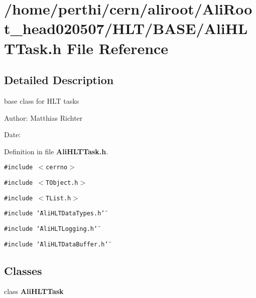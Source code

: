 \section{/home/perthi/cern/aliroot/Ali\-Root\_\-head020507/HLT/BASE/Ali\-HLTTask.h File Reference}
\label{AliHLTTask_8h}


\subsection{Detailed Description}
base class for HLT tasks 

\begin{Desc}
\item[Author:]Matthias Richter \end{Desc}
\begin{Desc}
\item[Date:]\end{Desc}


Definition in file {\bf Ali\-HLTTask.h}.

{\tt \#include $<$cerrno$>$}\par
{\tt \#include $<$TObject.h$>$}\par
{\tt \#include $<$TList.h$>$}\par
{\tt \#include \char`\"{}Ali\-HLTData\-Types.h\char`\"{}}\par
{\tt \#include \char`\"{}Ali\-HLTLogging.h\char`\"{}}\par
{\tt \#include \char`\"{}Ali\-HLTData\-Buffer.h\char`\"{}}\par
\subsection*{Classes}
\begin{CompactItemize}
\item 
class {\bf Ali\-HLTTask}
\end{CompactItemize}
